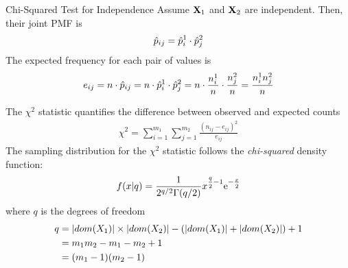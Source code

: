 \begin{frame}{Chi-Squared Test for Independence}
  \small
Assume $\mathbf{X}_1$ and $\mathbf{X}_2$ are independent. Then, their joint
PMF is
\begin{align*}
    \hat{p}_{ij} = \hat{p}^1_{i} \cdot \hat{p}^2_{j}
\end{align*}
The expected frequency for each pair of values is
\begin{align*}
    e_{ij} = n \cdot \hat{p}_{ij} = n \cdot \hat{p}^1_{i} \cdot \hat{p}^2_{j} =
    n \cdot {n^1_{i} \over n}
    \cdot {n^2_{j} \over n}
    = {n^1_{i} n^2_{j} \over n}
\end{align*}

The $\chi^2$ statistic quantif\/{i}es
the difference between observed and expected counts
\begin{align*}
  \chi^2 = \sum_{i=1}^{m_1}\sum_{j=1}^{m_2}
    \frac{(n_{ij} - e_{ij})^{2}}{e_{ij}}
\end{align*} 
The sampling
distribution for the $\chi^2$ statistic 
follows the {\em chi-squared} density function:
\begin{align*}
  f(x|q) = \frac{1}{2^{q/2}\Gamma(q/2)}
  x^{\frac{\raisebox{1.7pt}{\fontsize{6}{8}\selectfont $q$}}{\raisebox{-2.0pt}{\fontsize{6}{8}\selectfont 2}}-1}\mathrm{e}^{-\frac{x}{\raisebox{-2.0pt}{\fontsize{6}{8}\selectfont 2}}}
  \label{eq:eda:cat:chisq}
\end{align*}
where $q$ is the degrees of freedom
\begin{align*}
    q & = |dom(X_1)| \times |dom(X_2)| -
    (|dom(X_1)| + |dom(X_2)|) + 1\\
    & = m_1m_2 -m_1 -m_2 + 1\\
    & = (m_1 - 1)(m_2-1)
\end{align*}
\end{frame}


